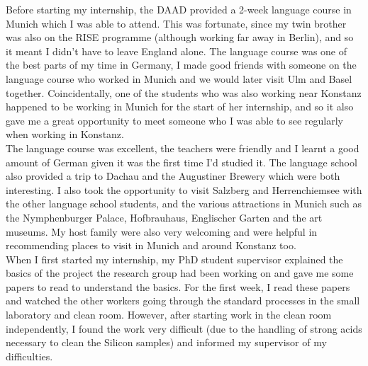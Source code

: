 \documentclass[final,a4paper,oneside,12pt]{article}
\begin{document}
Before starting my internship, the DAAD provided a 2-week language course in Munich which I was able to attend. This was fortunate, since my twin brother was also on the RISE programme (although working far away in Berlin), and so it meant I didn't have to leave England alone. The language course was one of the best parts of my time in Germany, I made good friends with someone on the language course who worked in Munich and we would later visit Ulm and Basel together. Coincidentally, one of the students who was also working near Konstanz happened to be working in Munich for the start of her internship, and so it also gave me a great opportunity to meet someone who I was able to see regularly when working in Konstanz.\\



The language course was excellent, the teachers were friendly and I learnt a good amount of German given it was the first time I'd studied it. The language school also provided a trip to Dachau and the Augustiner Brewery which were both interesting. I also took the opportunity to visit Salzberg and Herrenchiemsee with the other language school students, and the various attractions in Munich such as the Nymphenburger Palace, Hofbrauhaus, Englischer Garten and the art museums. My host family were also very welcoming and were helpful in recommending places to visit in Munich and around Konstanz too.\\

When I first started my internship, my PhD student supervisor explained the basics of the project the research group had been working on and gave me some papers to read to understand the basics. For the first week, I read these papers and watched the other workers going through the standard processes in the small laboratory and clean room. However, after starting work in the clean room independently, I found the work very difficult (due to the handling of strong acids necessary to clean the Silicon samples) and informed my supervisor of my difficulties.\\
\end{document}
